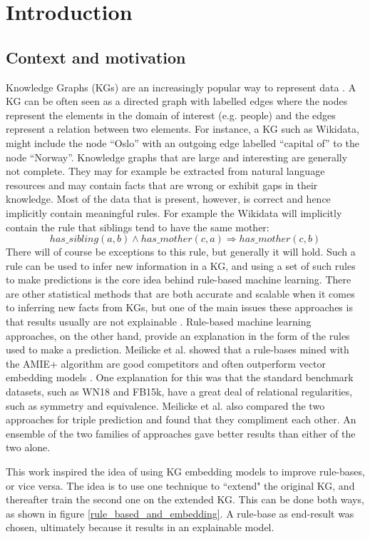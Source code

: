 \chapter{Introduction}
\section{Context and motivation}
Knowledge Graphs (KGs) are an increasingly popular way to represent data \cite{hogan2020knowledge}.
A KG can be often seen as a directed graph with labelled edges where the nodes represent the elements in the domain of interest (e.g. people) and the edges represent a relation between two elements. For instance, a KG such as Wikidata, might include the node ``Oslo'' with an outgoing edge labelled ``capital of'' to the node ``Norway''. Knowledge graphs that are large and interesting are generally not complete. They may for example be extracted from natural language resources and may contain facts that are wrong or exhibit gaps in their knowledge. Most of the data that is present, however, is correct and hence implicitly contain meaningful rules. For example the Wikidata will implicitly contain the rule that siblings tend to have the same mother:
\[has\_sibling(a, b) \wedge has\_mother(c, a) \Rightarrow has\_mother(c, b)\]
There will of course be exceptions to this rule, but generally it will hold. Such a rule can be used to infer new information in a KG, and using a set of such rules to make predictions is the core idea behind rule-based machine learning. There are other statistical methods that are both accurate and scalable when it comes to inferring new facts from KGs, but one of the main issues these approaches is that results usually are not explainable \cite{bonatti2019knowledge}. Rule-based machine learning approaches, on the other hand, provide an explanation in the form of the rules used to make a prediction. Meilicke et al. showed that a rule-bases mined with the AMIE+ algorithm are good competitors and often outperform vector embedding models \cite{ensemble}. One explanation for this was that the standard benchmark datasets, such as WN18 and FB15k,  have a great deal of relational regularities, such as symmetry and equivalence. Meilicke et al. also compared the two approaches for triple prediction and found that they compliment each other. An ensemble of the two families of approaches gave better results than either of the two alone.

This work inspired the idea of using KG embedding models to improve rule-bases, or vice versa. The idea is to use one technique to ``extend" the original KG, and thereafter train the second one on the extended KG. This can be done both ways, as shown in figure \ref{rule_based_and_embedding}. A rule-base as end-result was chosen, ultimately because it results in an explainable model. 


